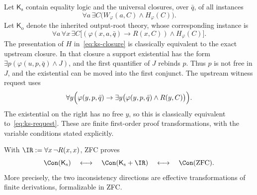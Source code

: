 Let $\mathsf K_{\mathrm s}$ contain equality logic and the universal
closures, over $\bar q$, of all instances
\begin{equation}
  \forall a\,\exists C
       \bigl(W_\varphi(a,C)\land H_\varphi(C)\bigr).
  \label{eq:ks-schema}
\end{equation}
Let $\mathsf K_{\mathrm o}$ denote the inherited output-root theory,
whose corresponding instance is
\begin{equation}
 \forall a\,\forall x\,\exists C
 \bigl[(\varphi(x,a,\bar q)\to R(x,C))\land H_\varphi(C)\bigr].
 \label{eq:ko-schema}
\end{equation}
The presentation of $H$ in~\eqref{eq:ks-closure} is classically equivalent
to the exact upstream closure.  In that closure a support existential
has the form $\exists p(\varphi(u,p,\bar q)\land J)$, and the first
quantifier of $J$ rebinds $p$.  Thus $p$ is not free in $J$, and the
existential can be moved into the first conjunct.  The upstream witness
request uses
\begin{equation}
 \forall y\Bigl(\varphi(y,p,\bar q)\to
       \exists y\bigl(\varphi(y,p,\bar q)\land R(y,C)\bigr)\Bigr).
 \label{eq:ks-universal-request}
\end{equation}
The existential on the right has no free $y$, so this is classically
equivalent to~\eqref{eq:ks-request}.  These are finite first-order proof
transformations, with the variable conditions stated explicitly.

\begin{theorem}
\label{thm:ks-calibration}
With $\IR:=\forall x\,\neg R(x,x)$, ZFC proves
\[
 \Con(\mathsf K_{\mathrm s})
 \quad\longleftrightarrow\quad
 \Con(\mathsf K_{\mathrm s}+\IR)
 \quad\longleftrightarrow\quad
 \Con(\mathrm{ZFC}).
\]
More precisely, the two inconsistency directions are effective
transformations of finite derivations, formalizable in ZFC.
\end{theorem}

